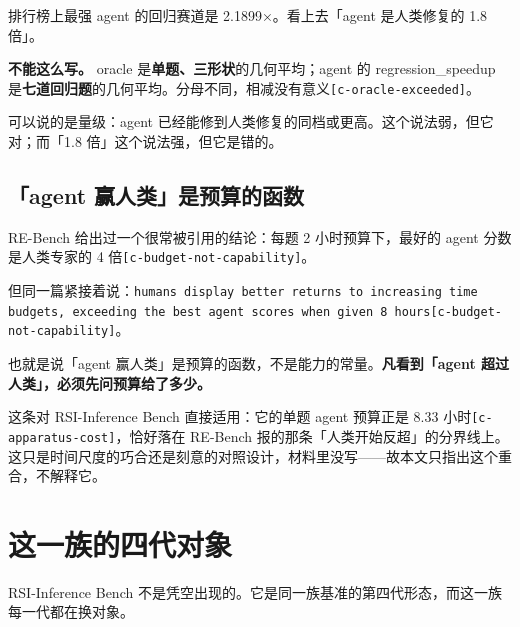 排行榜上最强 agent 的回归赛道是 2.1899×。看上去「agent 是人类修复的 1.8 倍」。


\textbf{不能这么写。} oracle 是\textbf{单题、三形状}的几何平均；agent 的 regression\_speedup 是\textbf{七道回归题}的几何平均。分母不同，相减没有意义{\scriptsize\texttt{[c-\hspace{0pt}oracle-\hspace{0pt}exceeded]}}。


可以说的是量级：agent 已经能修到人类修复的同档或更高。这个说法弱，但它对；而「1.8 倍」这个说法强，但它是错的。


\subsection{「agent 赢人类」是预算的函数}

RE-Bench 给出过一个很常被引用的结论：每题 2 小时预算下，最好的 agent 分数是人类专家的 4 倍{\scriptsize\texttt{[c-\hspace{0pt}budget-\hspace{0pt}not-\hspace{0pt}capability]}}。


但同一篇紧接着说：\texttt{humans display better returns to increasing time budgets, exceeding the best agent scores when given 8 hours}{\scriptsize\texttt{[c-\hspace{0pt}budget-\hspace{0pt}not-\hspace{0pt}capability]}}。


也就是说「agent 赢人类」是预算的函数，不是能力的常量。\textbf{凡看到「agent 超过人类」，必须先问预算给了多少。}


这条对 RSI-Inference Bench 直接适用：它的单题 agent 预算正是 8.33 小时{\scriptsize\texttt{[c-\hspace{0pt}apparatus-\hspace{0pt}cost]}}，恰好落在 RE-Bench 报的那条「人类开始反超」的分界线上。这只是时间尺度的巧合还是刻意的对照设计，材料里没写——故本文只指出这个重合，不解释它。


\section{这一族的四代对象}

RSI-Inference Bench 不是凭空出现的。它是同一族基准的第四代形态，而这一族每一代都在换对象。



